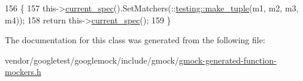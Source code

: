 \begin{DoxyCode}
156                                                     \{
157     this->\hyperlink{classtesting_1_1internal_1_1FunctionMockerBase_a744318106e20b346f4f1efbf5a601644}{current\_spec}().SetMatchers(::\hyperlink{namespacestd_1_1tr1_af7e12a0f5b5791b5b7c49a5a17b85359}{testing::make\_tuple}(m1, m2, m3, m4));
158     \textcolor{keywordflow}{return} this->\hyperlink{classtesting_1_1internal_1_1FunctionMockerBase_a744318106e20b346f4f1efbf5a601644}{current\_spec}();
159   \}
\end{DoxyCode}


The documentation for this class was generated from the following file\+:\begin{DoxyCompactItemize}
\item 
vendor/googletest/googlemock/include/gmock/\hyperlink{gmock-generated-function-mockers_8h}{gmock-\/generated-\/function-\/mockers.\+h}\end{DoxyCompactItemize}
